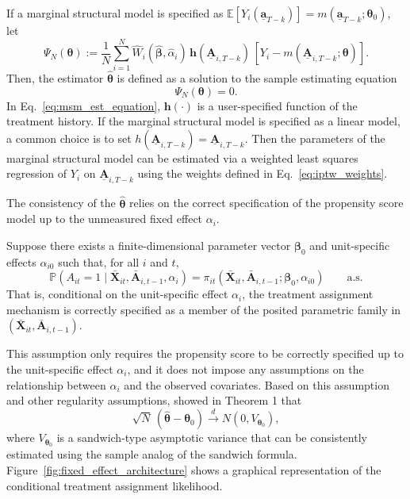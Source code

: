 If a marginal structural model is specified as 
$\mathbb{E}[Y_i(\underline{\mathbf{a}}_{T-k})] = m(\underline{\mathbf{a}}_{T-k}; \boldsymbol{\theta}_0)$,
let 
\begin{equation}
\Psi_N(\boldsymbol{\theta})
:=
\frac{1}{N} \sum_{i=1}^{N}
\widehat{W}_i(\hat{\boldsymbol{\beta}}, \hat{\alpha}_i)\,
\mathbf{h}\!\left(\underline{\mathbf{A}}_{i,T-k}\right)\,
\left[
Y_i - m\!\left(\underline{\mathbf{A}}_{i,T-k}; \boldsymbol{\theta} \right)
\right].
\label{eq:msm_est_equation}
\end{equation}
Then, the estimator $\hat{\boldsymbol{\theta}}$ is defined as a solution to the sample
estimating equation
\[
\Psi_N(\boldsymbol{\theta})=0.
\]
In Eq.~\eqref{eq:msm_est_equation}, $\mathbf{h}(\cdot)$ is a user-specified function of the treatment history. 
If the marginal structural model is specified as a linear model, a common choice is 
to set $h(\underline{\mathbf{A}}_{i,T-k}) = \underline{\mathbf{A}}_{i,T-k}$. Then the 
parameters of the marginal structural model can be estimated via a weighted 
least squares regression of $Y_i$ on $\underline{\mathbf{A}}_{i,T-k}$ using the weights 
defined in Eq.~\eqref{eq:iptw_weights}. 

The consistency of the $\hat{\boldsymbol{\theta}}$ relies on the 
correct specification of the propensity score 
model up to the unmeasured fixed effect $\alpha_i$. 

\begin{modassumpFE}
\label{ass:ps-correct-spec}
Suppose there exists a finite-dimensional parameter vector $\boldsymbol{\beta}_0$ 
and unit-specific effects
$\alpha_{i0}$ such that, for all $i$ and $t$,
\[
\mathbb{P}(A_{it}=1 \mid \bar{\mathbf{X}}_{it}, \bar{\mathbf{A}}_{i,t-1}, \alpha_i)
=
\pi_{it}(\bar{\mathbf{X}}_{it}, \bar{\mathbf{A}}_{i,t-1}; \boldsymbol{\beta}_0, \alpha_{i0})
\qquad \text{a.s.}
\]
That is, conditional on the unit-specific effect $\alpha_i$, 
the treatment assignment mechanism
is correctly specified as a member of the posited parametric family 
in $(\bar{\mathbf{X}}_{it},\bar{\mathbf{A}}_{i,t-1})$.
\end{modassumpFE}

This assumption only requires the propensity score to be correctly specified up to the 
unit-specific effect $\alpha_i$, and it does not impose any assumptions on the 
relationship between $\alpha_i$ and the observed covariates. Based on this assumption and 
other regularity assumptions,  showed in 
Theorem 1 that 
\[
\sqrt{N}\,(\widehat{\boldsymbol{\theta}}-\boldsymbol{\theta}_{0})
\overset{d}{\to}
N(0, V_{\boldsymbol{\theta}_0}),
\]
where $V_{\boldsymbol{\theta}_0}$ is a sandwich-type asymptotic variance that can be consistently estimated using the sample analog of the sandwich formula.
Figure~\ref{fig:fixed_effect_architecture} shows a graphical representation of the conditional treatment assignment likelihood. 


